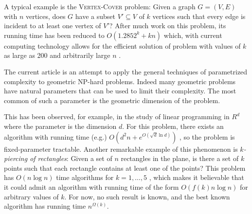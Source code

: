 \documentclass[ccfonts,lotsofwhite]{patmorin}
\begin{document}
A typical example is the \textsc{Vertex-Cover} problem: Given a graph
$G=(V,E)$ with $n$ vertices, does $G$ have a subset $V'\subseteq V$ of
$k$ vertices such that every edge is incident to at least one vertex
of $V'$?  After much work on this problem, its running time has been
reduced to $O(1.2852^k + kn)$ which, with current computing technology
allows for the efficient solution of problem with values of $k$ as
large as 200 and arbitrarily large $n$ \cite{ckj01}.


The current article is an attempt to apply the general techniques of
parametrized complexity to geometric NP-hard problems. Indeed many
geometric problems have natural parameters that can be used to limit
their complexity.  The most common of such a parameter is the
geometric dimension of the problem.

This has been observed, for example, in the study of linear
programming in $R^d$ where the parameter is the dimension $d$.  For
this problem, there exists an algorithm with running time (e.g.)
$O(d^2n + e^{O(\sqrt{d}\ln d)})$ \cite{msw96}, so the problem is
fixed-parameter tractable.  Another remarkable example of this
phenomenon is \emph{$k$-piercing of rectangles}: Given a set of $n$
rectangles in the plane, is there a set of $k$ points such that each
rectangle contains at least one of the points? This problem has
$O(n\log n)$ time algorithms for $k=1,\ldots,5$
\cite{mt97,n97,s99,sw96}, which makes it believable that it could
admit an algorithm with running time of the form $O(f(k)n\log n)$ for
arbitrary values of $k$.  For now, no such result is known, and the
best known algorithm has running time $n^{\Omega(k)}$.


\end{document}
